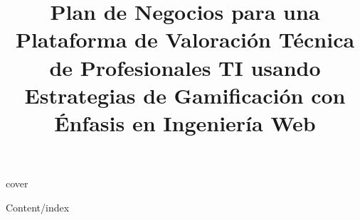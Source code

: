 \documentclass[a4papper, man, spanish, table, xcdraw]{meta/apa7}
\title{Plan de Negocios para una Plataforma de Valoración
Técnica de Profesionales TI usando Estrategias de
Gamificación con Énfasis en Ingeniería Web}
\begin{document}
{cover}

{Content/index}
\end{document}
